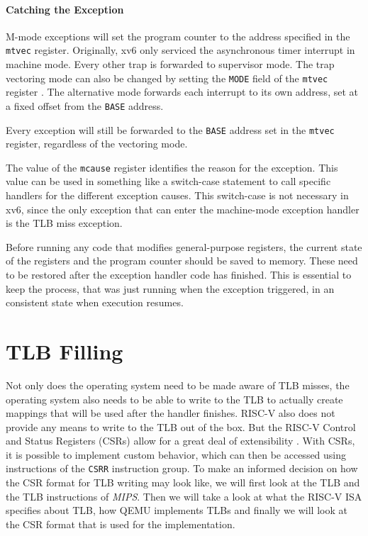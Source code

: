 \paragraph{Catching the Exception} M-mode exceptions will set the program counter to the address
specified in the \texttt{mtvec} register. Originally, xv6 only serviced the asynchronous
timer interrupt in machine mode. Every other trap is forwarded to supervisor mode.
The trap vectoring mode can also be changed by setting the \texttt{MODE} field of the
\texttt{mtvec} register \cite{RISCVInstructionSet}. The alternative mode forwards
each interrupt to its own address, set at a fixed offset from the \texttt{BASE} address.

Every exception will still be forwarded to the \texttt{BASE} address set in the \texttt{mtvec}
register, regardless of the vectoring mode.

The value of the \texttt{mcause} register identifies the reason for the exception.
This value can be used in something like a switch-case statement to call specific handlers
for the different exception causes.
This switch-case is not necessary in xv6, since the only exception that can enter
the machine-mode exception handler is the TLB miss exception.

Before running any code that modifies general-purpose registers, the current state of the
registers and the program counter should be saved to memory. These need to be restored after
the exception handler code has finished.
This is essential to keep the process, that was just running when the exception triggered,
in an consistent state when execution resumes.


\section{TLB Filling}
Not only does the operating system need to be made aware of TLB misses,
the operating system also needs to be able to write to the TLB to actually create
mappings that will be used after the handler finishes.
RISC-V also does not provide any means to write to the TLB out of the box. But the RISC-V Control and Status Registers
(CSRs) allow for a great deal of extensibility \cite{riscvreader}.
With CSRs, it is possible to implement custom behavior, which can then be accessed using instructions
of the \texttt{CSRR} instruction group.
To make an informed decision on how the CSR format for TLB writing may look like, we will first
look at the TLB and the TLB instructions of \emph{MIPS}. Then we will take a look at what the
RISC-V ISA specifies about TLB, how QEMU implements TLBs and finally we will look at the
CSR format that is used for the implementation.


